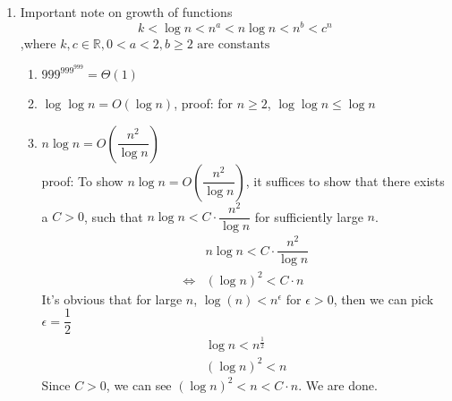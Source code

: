 \documentclass[11pt]{article}
\newcommand{\R}{\mathbb{R}}
\begin{document}
\begin{enumerate}
\item Important note on growth of functions
$$k < \log n < n^{a} < n \log n < n^{b} < c^{n}$$
,where $k, c \in \R , 0 < a < 2, b \geq 2 \text{ are constants}$
\begin{enumerate}
\item $999^{999^{999}} = \Theta (1)$
\item $\log \log n = O(\log n)$, proof: for $n \geq 2$, $\log \log n \leq \log n$\\
\item $n \log n = O(\dfrac{n^2}{\log n})$\\
proof: To show $n \log n = O(\dfrac{n^2}{\log n})$, it suffices to show that there exists a $C > 0$, such that $n \log n < C \cdot \dfrac{n^2}{\log n}$ for sufficiently large $n$.
\begin{align*}
& n \log n  < C \cdot \dfrac{n^2}{\log n}\\
\iff & (\log n)^2 < C \cdot n
\end{align*}
It's obvious that for large $n$, $\log (n) < n^{\epsilon}$ for $\epsilon > 0$, then we can pick $\epsilon =  \dfrac{1}{2}$
\begin{align*}
\log n < n^{\frac{1}{2}}\\
(\log n) ^2 < n
\end{align*}
Since $C > 0$, we can see $(\log n) ^2 < n < C \cdot n$. We are done.
\end{enumerate}


\end{enumerate}
\end{document}

